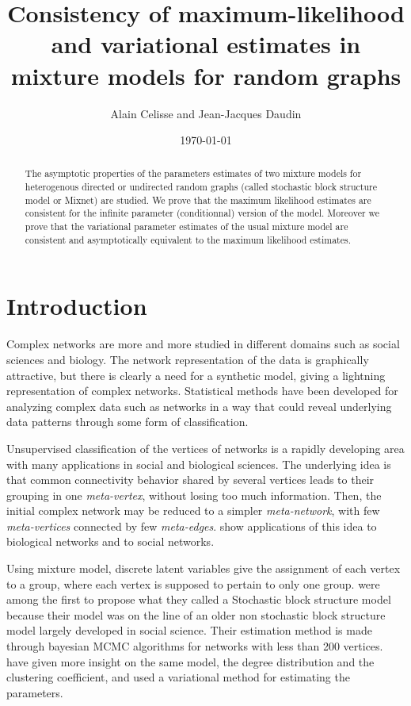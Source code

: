 \documentclass[11pt]{article}
\begin{document}
\title{Consistency of maximum-likelihood and variational estimates in mixture models for random graphs}

\author{Alain Celisse and Jean-Jacques Daudin}

\date{\today}

\maketitle



\begin{abstract}
The asymptotic properties of the parameters estimates of two mixture models for heterogenous directed or undirected random graphs (called stochastic block structure model or Mixnet) are studied.
%
We prove that the maximum likelihood estimates are consistent for the infinite parameter (conditionnal) version of the model.
%
Moreover we prove that the variational parameter estimates of the usual mixture model are consistent and asymptotically equivalent to the maximum likelihood estimates.
\end{abstract}



\section{Introduction}

Complex networks are more and more studied in different domains such as social sciences and biology.
%
The network representation of the data is graphically attractive, but there is clearly a need for a synthetic model, giving a lightning representation of complex networks.
%
Statistical methods have been developed for analyzing complex data such as networks in a way that could reveal underlying data patterns through some form of classification.

Unsupervised classification of the vertices of networks is a rapidly developing area with many applications in social and biological sciences.
%
The underlying idea is that common connectivity behavior shared by several vertices leads to  their grouping in one {\it meta-vertex}, without losing too much information.
%
Then, the initial complex network may be reduced to a simpler {\it meta-network}, with few {\it meta-vertices} connected by few {\it meta-edges}.
%
\cite{PMDCR} show applications of this idea to biological networks and  \cite{NS} to social networks.

Using mixture model, discrete latent variables give the assignment of each vertex to a group, where each vertex is supposed to pertain to only one group.
%
\cite{NS}  were among the first to propose what they called a Stochastic block structure model because their model was on the line of an older non stochastic block structure model largely developed in social science.
%
Their estimation method is made through bayesian MCMC algorithms for networks with less than 200 vertices. \cite{DPR} have given more insight on the same model, the degree distribution and the clustering coefficient, and used a variational method for estimating the parameters.
\end{document}
